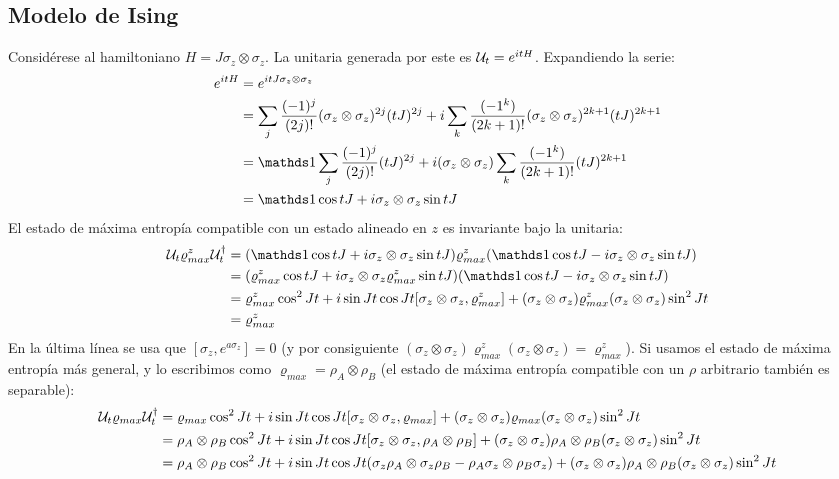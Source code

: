 \subsection{Modelo de Ising}
Considérese al hamiltoniano $H=J\sigma_{z}\otimes\sigma_{z}$. La unitaria generada por este es $\mathcal{U}_{t}=e^{itH}$. Expandiendo la serie:
\begin{align*}
    e^{itH}&=e^{itJ\sigma_{z}\otimes\sigma_{z}}\\
    &=\sum_{j}\frac{(-1)^{j}}{(2j)!}(\sigma_{z}\otimes\sigma_{z})^{2j}(tJ)^{2j}+i\sum_{k}\frac{(-1^{k})}{(2k+1)!}(\sigma_{z}\otimes\sigma_{z})^{2k+1}(tJ)^{2k+1}\\
    &=\Id\sum_{j}\frac{(-1)^{j}}{(2j)!}(tJ)^{2j}+i(\sigma_{z}\otimes\sigma_{z})\sum_{k}\frac{(-1^{k})}{(2k+1)!}(tJ)^{2k+1}\\
    &=\Id \cos{tJ} + i\sigma_{z}\otimes\sigma_{z}\sin{tJ}
\end{align*}
El estado de máxima entropía compatible con un estado alineado en $z$ es invariante bajo la unitaria:
\begin{align*}
    \mcU_{t}\varrho_{max}^{z}\mcU_{t}^{\dag}&=(\Id \cos{tJ} + i\sigma_{z}\otimes\sigma_{z}\sin{tJ})\varrho_{max}^{z}(\Id \cos{tJ} - i\sigma_{z}\otimes\sigma_{z}\sin{tJ})\\
    &=(\varrho_{max}^{z} \cos{tJ} + i\sigma_{z}\otimes\sigma_{z}\varrho_{max}^{z}\sin{tJ})(\Id \cos{tJ} - i\sigma_{z}\otimes\sigma_{z}\sin{tJ})\\
    &=\varrho_{max}^{z} \cos^{2}{Jt}+i\sin{Jt}\cos{Jt}[\sigma_{z}\otimes\sigma_{z},\varrho_{max}^{z}]+(\sigma_{z}\otimes\sigma_{z}) \varrho_{max}^{z} (\sigma_{z}\otimes\sigma_{z}) \sin^{2}{Jt}\\
    &=\varrho_{max}^{z}
\end{align*}
En la última línea se usa que $[\sigma_{z},e^{a\sigma_{z}}]=0$ (y por consiguiente $(\sigma_{z}\otimes\sigma_{z}) \varrho_{max}^{z} (\sigma_{z}\otimes\sigma_{z})=\varrho_{max}^{z}$). Si usamos el estado de máxima entropía más general, y lo escribimos como $\varrho_{max}=\rho_{A}\otimes\rho_{B}$ (el estado de máxima entropía compatible con un $\rho$ arbitrario también es separable):
\begin{align*}
    \mathcal{U}_{t}\varrho_{max}\mathcal{U}_{t}^{\dag}&=\varrho_{max}\cos^{2}{Jt}+i\sin{Jt}\cos{Jt}[\sigma_{z}\otimes\sigma_{z},\varrho_{max}]+(\sigma_{z}\otimes\sigma_{z}) \varrho_{max} (\sigma_{z}\otimes\sigma_{z}) \sin^{2}{Jt}\\
    &=\rho_{A}\otimes\rho_{B}\cos^{2}{Jt}+i\sin{Jt}\cos{Jt}[\sigma_{z}\otimes\sigma_{z},\rho_{A}\otimes\rho_{B}]+(\sigma_{z}\otimes\sigma_{z}) \rho_{A}\otimes\rho_{B} (\sigma_{z}\otimes\sigma_{z}) \sin^{2}{Jt}\\
    &=\rho_{A}\otimes\rho_{B}\cos^{2}{Jt}+i\sin{Jt}\cos{Jt}(\sigma_{z}\rho_{A}\otimes\sigma_{z}\rho_{B} - \rho_{A}\sigma_{z}\otimes\rho_{B}\sigma_{z})+(\sigma_{z}\otimes\sigma_{z}) \rho_{A}\otimes\rho_{B} (\sigma_{z}\otimes\sigma_{z}) \sin^{2}{Jt}
\end{align*}
